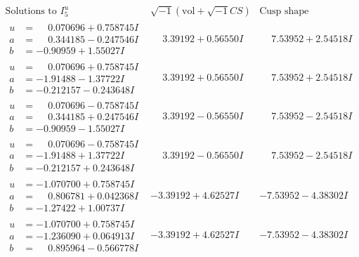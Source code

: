 \documentclass[1p]{elsarticle_modified}
\theoremstyle{definition}
\newcommand{\I}{\sqrt{-1}}
\begin{document}
$$\begin{array}{c|c|c}  
\text{Solutions to }I^u_{5}& \I (\text{vol} + \sqrt{-1}CS) & \text{Cusp shape}\\
 \hline 
\begin{aligned}
u &= \phantom{-}0.070696 + 0.758745 I \\
a &= \phantom{-}0.344185 - 0.247546 I \\
b &= -0.90959 + 1.55027 I\end{aligned}
 & \phantom{-}3.39192 + 0.56550 I & \phantom{-}7.53952 + 2.54518 I \\ \hline\begin{aligned}
u &= \phantom{-}0.070696 + 0.758745 I \\
a &= -1.91488 - 1.37722 I \\
b &= -0.212157 - 0.243648 I\end{aligned}
 & \phantom{-}3.39192 + 0.56550 I & \phantom{-}7.53952 + 2.54518 I \\ \hline\begin{aligned}
u &= \phantom{-}0.070696 - 0.758745 I \\
a &= \phantom{-}0.344185 + 0.247546 I \\
b &= -0.90959 - 1.55027 I\end{aligned}
 & \phantom{-}3.39192 - 0.56550 I & \phantom{-}7.53952 - 2.54518 I \\ \hline\begin{aligned}
u &= \phantom{-}0.070696 - 0.758745 I \\
a &= -1.91488 + 1.37722 I \\
b &= -0.212157 + 0.243648 I\end{aligned}
 & \phantom{-}3.39192 - 0.56550 I & \phantom{-}7.53952 - 2.54518 I \\ \hline\begin{aligned}
u &= -1.070700 + 0.758745 I \\
a &= \phantom{-}0.806781 + 0.042368 I \\
b &= -1.27422 + 1.00737 I\end{aligned}
 & -3.39192 + 4.62527 I & -7.53952 - 4.38302 I \\ \hline\begin{aligned}
u &= -1.070700 + 0.758745 I \\
a &= -1.236090 + 0.064913 I \\
b &= \phantom{-}0.895964 - 0.566778 I\end{aligned}
 & -3.39192 + 4.62527 I & -7.53952 - 4.38302 I \\ \hline\begin{aligned}

\end{aligned}
\end{array}$$
\end{document}
